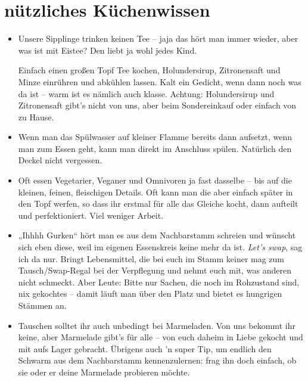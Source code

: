 \newpage
\section{nützliches Küchenwissen}
\begin{itemize}
    \item Unsere Sipplinge trinken keinen Tee – jaja das hört man immer wieder, aber was ist mit Eistee? Den liebt ja wohl jedes Kind.

    Einfach einen großen Topf Tee kochen, Holundersirup, Zitronensaft und Minze einrühren und abkühlen lassen. Kalt ein Gedicht, wenn dann noch was da ist – warm ist es nämlich auch klasse.
    Achtung: Holundersirup und Zitronensaft gibt’s nicht von uns, aber beim Sondereinkauf oder einfach von zu Hause.
    
    \item Wenn man das Spülwasser auf kleiner Flamme bereits dann aufsetzt, wenn man zum Essen geht, kann man direkt im Anschluss spülen. Natürlich den Deckel nicht vergessen.
 
    \item Oft essen Vegetarier, Veganer und Omnivoren ja fast dasselbe – bis auf die kleinen, feinen, fleischigen Details. Oft kann man die aber einfach später in den Topf werfen, so dass ihr erstmal für alle das Gleiche kocht, dann aufteilt und perfektioniert. Viel weniger Arbeit.

    \item „Ihhhh Gurken“ hört man es aus dem Nachbarstamm schreien und wünscht sich eben diese, weil im eigenen Essenskreis keine mehr da ist. \emph{Let's swap}, sag ich da nur. Bringt Lebensmittel, die bei euch im Stamm keiner mag zum Tausch/Swap-Regal bei der Verpflegung und nehmt euch mit, was anderen nicht schmeckt. 
Aber Leute: Bitte nur Sachen, die noch im Rohzustand sind, nix gekochtes – damit läuft man über den Platz und bietet es hungrigen Stämmen an.

    \item Tauschen solltet ihr auch unbedingt bei Marmeladen. Von uns bekommt ihr keine, aber Marmelade gibt’s für alle – von euch daheim in Liebe gekocht und mit aufs Lager gebracht. Übrigens auch 'n super Tip, um endlich den Schwarm aus dem Nachbarstamm kennenzulernen: frag ihn doch einfach, ob sie oder er deine Marmelade probieren möchte.
 

\end{itemize}
